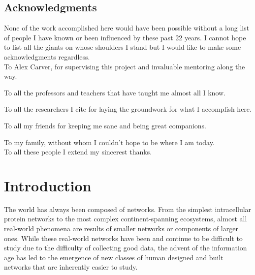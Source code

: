 \documentclass[12pt,twoside]{report}
\begin{document}
\cleardoublepage

\section*{Acknowledgments}

None of the work accomplished here would have been possible without a long list of people I have known or been influenced by these past 22 years. I cannot hope to list all the giants on whose shoulders I stand but I would like to make some acknowledgments regardless. \\

To Alex Carver, for supervising this project and invaluable mentoring along the way.

To all the professors and teachers that have taught me almost all I know.

To all the researchers I cite for laying the groundwork for what I accomplish here.

To all my friends for keeping me sane and being great companions. 

To my family, without whom I couldn't hope to be where I am today.\\
 
To all these people I extend my sincerest thanks. \\

\clearpage{\pagestyle{empty}\cleardoublepage}

\tableofcontents 


\clearpage{\pagestyle{empty}\cleardoublepage}
\setcounter{page}{1}
\fancyhead[LE,RO]{\slshape \rightmark}
\fancyhead[LO,RE]{\slshape \leftmark}

\chapter{Introduction}

The world has always been composed of networks. From the simplest intracellular protein networks to the most complex continent-spanning ecosystems, almost all real-world phenomena are results of smaller networks or components of larger ones. While these real-world networks have been and continue to be difficult to study due to the difficulty of collecting good data, the advent of the information age has led to the emergence of new classes of human designed and built networks that are inherently easier to study. \\
\end{document}

